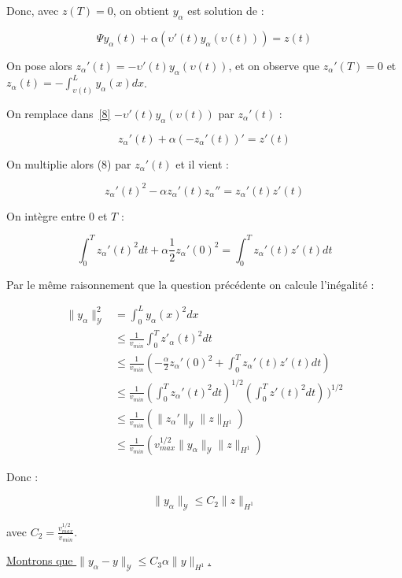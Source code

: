 \documentclass[a4paper]{article}
\newcommand{\Y}{\mathscr{Y}}
\begin{document}
\begin{preuve}
Donc, avec $z(T)=0$, on obtient $y_\alpha$ est solution de :

\[ \Psi y_{\alpha} (t) + \alpha (\upsilon'(t) y_{\alpha}(\upsilon(t))) = z(t)\]

On pose alors $z_{\alpha}'(t) = - \upsilon'(t)y_{\alpha}(\upsilon(t))$,
et on observe que $z_{\alpha}'(T) =0$ et $z_{\alpha}(t) = - \int_{\upsilon(t)}^L y_{\alpha}(x)dx$.

On remplace dans~\eqref{8}
$- \upsilon'(t)y_{\alpha}(\upsilon(t))$ par $z_{\alpha}'(t)$ :

\[ z_\alpha'(t) + \alpha (-z_\alpha'(t))' = z'(t) \]

On multiplie alors (8) par $z_{\alpha}'(t)$
et il vient :

\[ z_{\alpha}'(t)^2 - \alpha z_{\alpha}'(t) z_{\alpha}'' = z_{\alpha}'(t)z'(t) \]

On intègre entre $0$ et $T$ :

\[ \displaystyle  \int_0^T z_\alpha '(t)^2 dt + \alpha \frac{1}{2}z_\alpha '(0)^2
          =  \int_0^T z_\alpha '(t)z'(t)dt \]

Par le même raisonnement que la question précédente on calcule l'inégalité :

\[
\begin{split}
\| y_{\alpha} \|_{\mathscr{Y}}^2 &= \int_0^L y_\alpha(x)^2dx \\
	     & \leq \displaystyle \frac{1}{v_{min}} \int_0^T z'_{\alpha}(t)^2dt\\
	     &\leq \displaystyle \frac{1}{v_{min}}
				 (- \frac{\alpha}{2} z_\alpha '(0)^2 
				 	+ \int_0^T z_\alpha '(t)z'(t)dt) \\
		 & \leq \displaystyle \frac{1}{v_{min}}
			(\int_0^T z_\alpha'(t)^2 dt)^{1/2}
			 (\int_0^Tz'(t)^2 dt)\,)^{1/2}  \\
		&\leq \displaystyle \frac{1}{v_{min}}
			(\| z_\alpha'\|_{\Y} \| z \|_{H^1} ) \\
		& \leq \displaystyle \frac{1}{v_{min}}
			( v_{max}^{1/2} \| y_\alpha \|_{\Y} \| z \|_{H^1} ) 
\end{split}
\]

Donc :

\[ \| y_{\alpha} \|_{\mathscr{Y}} \leq \displaystyle C_2
                                                     \| z \|_{H^1} \]

avec $C_2= \displaystyle \frac{ v_{max}^{1/2} }{ v_{min}}$.


\vspace{0.5cm}
\underline{Montrons que $\| y_\alpha - y \|_{\Y} \leq C_3 \alpha \| y \|_{H^1}$.}
\vspace{0.5cm}


\end{preuve}
\end{document}
